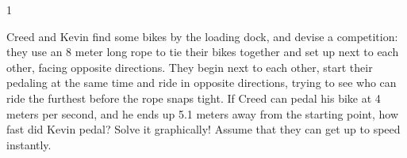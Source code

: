 
\AddToShipoutPicture*{\BackgroundPic}

\addtocounter {ProbNum} {1}

 
{\bf \Large{}} Creed and Kevin find some bikes by the loading dock, and devise a competition: they use an 8 meter long rope to tie their bikes together and set up next to each other, facing opposite directions.  They begin next to each other, start their pedaling at the same time and ride in opposite directions, trying to see who can ride the furthest before the rope snaps tight. If Creed can pedal his bike at 4 meters per second, and he ends up 5.1 meters away from the starting point, how fast did Kevin pedal?  Solve it graphically!  Assume that they can get up to speed instantly.



\vfill

\newpage
